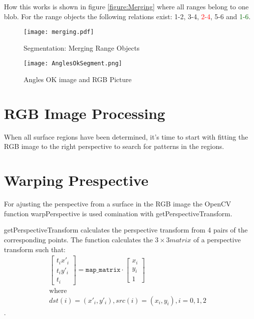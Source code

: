 How this works is shown in figure \vref{figure:Merging} where all ranges belong to one blob. For the range objects
the following relations exist: 1-2, 3-4, \textcolor{red}{2-4}, 5-6 and \textcolor{darkgreen}{1-6}.

\begin{figure}[H]
\begin{center}
  \texttt{[image: merging.pdf]}
  \caption{Segmentation: Merging Range Objects}
  \label{figure:Merging}
\end{center}
\end{figure}
 



\begin{figure}[H]
\begin{center}
  \texttt{[image: AnglesOkSegment.png]}
  \caption[Angles OK Image and RGB Picture]{Angles OK image and RGB Picture\footnotemark}
  \label{figure:AnglesOKSeg}
\end{center}
\end{figure}
\newpage

\section{RGB Image Processing}

When all surface regions have been determined, it's time to start with fitting the RGB image 
to the right perspective to search for patterns in the regions. 


\section{Warping Prespective}
For ajusting the perspective from a surface in the RGB image the OpenCV function warpPerspective
 is used comination with getPerspectiveTransform.

getPerspectiveTransform calculates the perspective transform from 4 pairs of the corresponding points.
The function calculates the $3 \times 3 matrix$ of a perspective transform such that:
\begin{gather}
\begin{bmatrix} t_i x'_i \\ t_i y'_i \\ t_i \end{bmatrix} = \texttt{map\_matrix} \cdot \begin{bmatrix} x_i \\ y_i \\ 1 \end{bmatrix} 
\nonumber\\\mbox{where}\nonumber\\dst(i)=(x'_i,y'_i), src(i)=(x_i, y_i), i=0,1,2 
\end{gather}
\cite{willowgarage:opencv:getPerspectiveTransform}.

